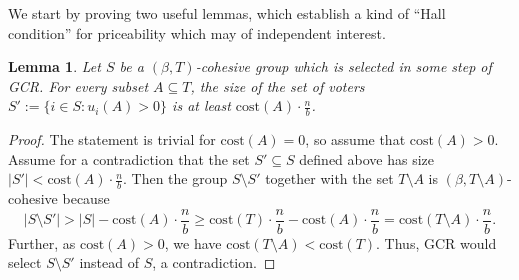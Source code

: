 \documentclass[10pt]{scrartcl}
\renewcommand*{\geq}{\geqslant}
\newcommand{\cost}{{{\mathrm{cost}}}}
\theoremstyle{definition}
\theoremstyle{plain}
\newtheorem{lemma}{Lemma}
\begin{document}
We start by proving two useful lemmas, which establish a kind of ``Hall condition'' for priceability which may of independent interest.



\begin{lemma}\label{fact-1}
	Let $S$ be a $(\beta, T)$-cohesive group which is selected in some step of GCR. For every subset $A \subseteq T$, the size of the set of voters $S':=\{i \in S\colon u_i(A) > 0\}$ is at least $\cost(A)\cdot \frac{n}{b}$.
\end{lemma}
\begin{proof}
	The statement is trivial for $\cost(A) = 0$, so assume that $\cost(A) > 0$. Assume for a contradiction that the set $S'\subseteq S$ defined above has size $|S'| < \cost(A)\cdot \frac{n}{b}$. Then the group $S \setminus S'$ together with the set $T \setminus A$ is $(\beta, T \setminus A)$-cohesive because
	\[
		\textstyle
		|S \setminus S'| > |S| - \cost(A)\cdot \frac{n}{b} \geq \cost(T)\cdot \frac{n}{b} - \cost(A)\cdot \frac{n}{b} = \cost(T \setminus A)\cdot \frac{n}{b} \text{.}
	\]
	Further, as $\cost(A) > 0$, we have $\cost(T \setminus A) < \cost(T)$. Thus, GCR would select $S\setminus S'$ instead of $S$, a contradiction.
\end{proof}
\end{document}

